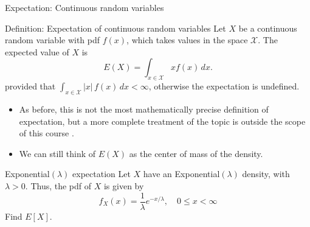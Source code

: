 \begin{frame}[allowframebreaks]{Expectation: Continuous random variables}

  \begin{block}{Definition: Expectation of continuous random variables}
    Let $X$ be a continuous random variable with pdf $f(x)$, which takes values in the space $\mathcal{X}$. The \alert{expected value} of $X$ is 
    $$
    E(X) = \int_{x\in \mathcal{X}}xf(x)\, dx.
    $$
    provided that $\int_{x\in \mathcal{X}}|x|\, f(x)\, dx < \infty$, otherwise the expectation is undefined. 
  \end{block}

 \begin{itemize}
    \item As before, this is not the most mathematically precise definition of expectation, but a more complete treatment of the topic is outside the scope of this course \citep[See][]{resnick19}.
    \item We can still think of $E(X)$ as the center of mass of the density.
  \end{itemize}

\framebreak

\begin{exampleblock}{Exponential$(\lambda)$ expectation}
  Let $X$ have an Exponential$(\lambda)$ density, with $\lambda > 0$. Thus, the pdf of $X$ is given by
  $$
  f_X(x) = \frac{1}{\lambda}e^{-x/\lambda}, \quad 0 \leq x < \infty
  $$
  Find $E[X]$.
\end{exampleblock}


\end{frame}
